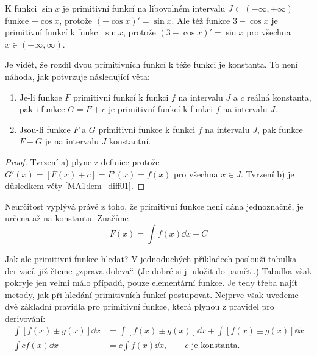     \begin{example} 
      K funkci $\sin x$ je primitivní funkcí na libovolném intervalu $J\subset(-\infty,+\infty)$ 
      funkce $-\cos x$, protože $(-\cos x)' = \sin x$. Ale též funkce $3-\cos x$ je primitivní 
      funkcí k funkci $\sin x$, protože $(3 - \cos x)' = \sin x$ pro všechna $x\in(-\infty, 
      \infty)$.
    \end{example}
    
    Je vidět, že rozdíl dvou primitivních funkcí k téže funkci je konstanta. To není náhoda, jak 
    potvrzuje následující věta:
    
    \begin{lemma}
      \begin{enumerate}[noitemsep]
        \item Je-li funkce $F$ primitivní funkcí k funkci \(f\) na intervalu \(J\) a \(c\) reálná  
              konstanta, pak i funkce $G = F + c$ je primitivní funkcí k funkci \(f\) na intervalu 
              \(J\).
        \item Jsou-li funkce $F$ a $G$ primitivní funkce k funkci \(f\) na intervalu \(J\), pak 
        funkce
              $F-G$ je na intervalu \(J\) konstantní.
      \end{enumerate} 
      \begin{proof}
        Tvrzení a) plyne z definice protože $G'(x) = [F(x) + c] = F'(x) = f(x)$ pro všechna $x\in
        J$. Tvrzení b) je důsledkem věty \ref{MA1:lem_diff01}.
      \end{proof}
    \end{lemma}
    Neurčitost vyplývá právě z toho, že primitivní funkce není dána jednoznačně, je určena až na 
    konstantu. Značíme
    \begin{equation*}
      \boxed{F(x) = \int f(x)\dd{x} + C}
    \end{equation*}
        
    Jak ale primitivní funkce hledat? V jednoduchých příkladech poslouží tabulka derivací, již čteme
    „zprava doleva“. (Je dobré si ji uložit do paměti.) Tabulka však pokryje jen velmi málo případů,
    pouze elementární funkce. Je tedy třeba najít metody, jak při hledání primitivních funkcí
    postupovat. Nejprve však uvedeme dvě základní pravidla pro primitivní funkce, která plynou z
    pravidel pro derivování:
    \begin{align}
      \int[f(x)\pm g(x)]\dd{x} &= \int[f(x)\pm g(x)]\dd{x} + \int[f(x)\pm g(x)]\dd{x} \label{MA1:eq_int10} \\
      \int cf(x)\dd{x}         &= c \int f(x)\dd{x}, \qquad \text{\(c\) je konstanta.} \label{MA1:eq_int11}
    \end{align}
  
